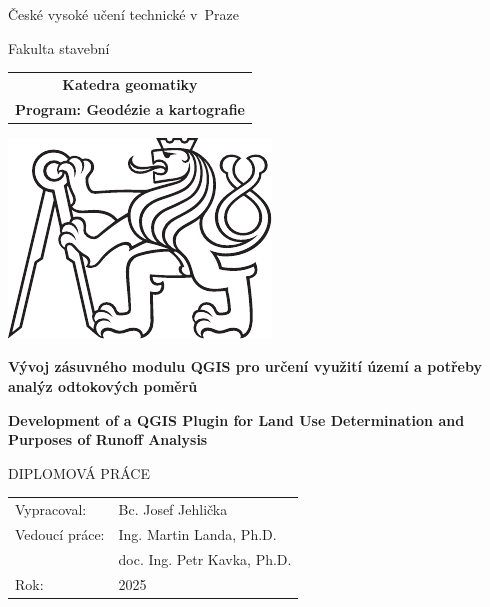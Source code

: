 \documentclass[a4paper,oneside,12pt]{book}
\newcommand{\tb}{\textbf} %
\newcommand{\cvut}{České vysoké učení technické v~Praze}
\newcommand{\fjfi}{Fakulta stavební}
\newcommand{\ksi}{Katedra geomatiky}
\newcommand{\program}{Geodézie a kartografie} %
\newcommand{\druh}{Diplomová práce} %
\newcommand{\logoCVUT}{\includegraphics{pictures/symbol_cvut_konturova_verze_cb.pdf}} %
\newcommand{\nazevcz}{Vývoj zásuvného modulu QGIS pro určení využití území a potřeby analýz odtokových poměrů}    %
\newcommand{\nazeven}{Development of a QGIS Plugin for Land Use Determination and Purposes of Runoff Analysis}          %
\newcommand{\autor}{Bc. Josef Jehlička}   %
\newcommand{\vedouci}{Ing. Martin Landa, Ph.D. } %
\newcommand{\druhyvedouci}{doc. Ing. Petr Kavka, Ph.D.}
\newcommand{\rok}{2025}  %
\begin{document}
\thispagestyle{empty}

\begin{center}
	{\LARGE
		\cvut\par
		\fjfi
	}
    \vspace{10mm}

    \begin{tabular}{c}
		\tb{\ksi} \\[3pt]   
		\tb{Program: \program}\\
    \end{tabular}

   \vspace{10mm} \logoCVUT \vspace{15mm} 

   {\huge \tb{\nazevcz}\par}
   \vspace{5mm}   
   {\huge \tb{\nazeven}\par}
   
   \vspace{15mm}
   {\Large \MakeUppercase{\druh}}

   \vfill
   {\large
    \begin{tabular}{ll}
    Vypracoval: & \autor\\
    Vedoucí práce: & \vedouci\\
    & \druhyvedouci \\
    Rok: & \rok
    \end{tabular}
   }
\end{center}



\newpage  %
\thispagestyle{empty} %

%









%
%
\end{document}

